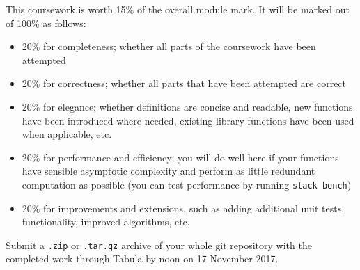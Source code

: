 \documentclass{cs256-shared/cs256}
\begin{document}
This coursework is worth 15\% of the overall module mark. It will be marked out of 100\% as follows:
\begin{itemize}
\item 20\% for completeness; whether all parts of the coursework have been attempted
\item 20\% for correctness; whether all parts that have been attempted are correct
\item 20\% for elegance; whether definitions are concise and readable, new functions have been introduced where needed, existing library functions have been used when applicable, etc. 
\item 20\% for performance and efficiency; you will do well here if your functions have sensible asymptotic complexity and perform as little redundant computation as possible (you can test performance by running \texttt{stack bench})
\item 20\% for improvements and extensions, such as adding additional unit tests, functionality, improved algorithms, etc.
\end{itemize}
Submit a \texttt{.zip} or \texttt{.tar.gz} archive of your whole git repository with the completed work through Tabula by noon on 17 November 2017.
\end{document}
